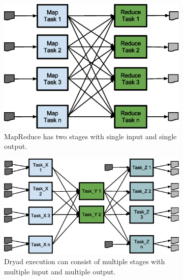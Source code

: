 \documentclass[a4paper,12pt,twoside,openright]{report}
\begin{document}
\begin{figure}[h!]
        \begin{subfigure}[b]{0.4\textwidth}
                \centering
                \includegraphics[width=\textwidth]{MapReduce.eps}
                \caption{MapReduce has
        two stages with single input and single output.}
                \label{fig:mapreduce}
        \end{subfigure}%
        \hspace{0.1pt}
        \begin{subfigure}[b]{0.5\textwidth}
                \centering
                \includegraphics[width=\textwidth]{Dryad.eps}
                \caption{Dryad execution can
        consist of multiple stages with multiple input and multiple output.}
                \label{fig:dryad}
        \end{subfigure}
        \vspace{0.1pt}
        \begin{subfigure}[b]{0.8\textwidth}

\end{subfigure}
\end{figure}
\end{document}
